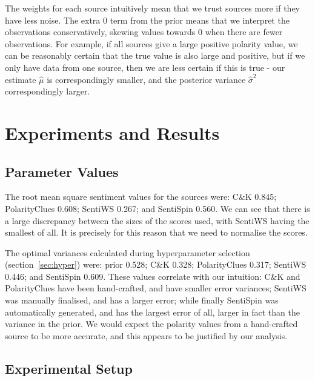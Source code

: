 \documentclass[11pt]{article}
\begin{document}
The weights for each source intuitively mean that we trust sources more if they have less noise. The extra $0$ term from the prior means that we interpret the observations conservatively, skewing values towards $0$ when there are fewer observations. For example, if all sources give a large positive polarity value, we can be reasonably certain that the true value is also large and positive, but if we only have data from one source, then we are less certain if this is
true - our estimate $\hat{\mu}$ is correspondingly smaller, and the posterior variance $\hat{\sigma}^2$ correspondingly larger.



\section{Experiments and Results} \label{sec:results}


\subsection{Parameter Values} \label{sec:param}

The root mean square sentiment values for the sources were: C\&K 0.845; PolarityClues 0.608; SentiWS 0.267; and SentiSpin 0.560.  We can see that there is a large discrepancy between the sizes of the scores used, with SentiWS having the smallest of all.  It is precisely for this reason that we need to normalise the scores.

The optimal variances calculated during hyperparameter selection (section~\ref{sec:hyper}) were: prior 0.528; C\&K 0.328; PolarityClues 0.317; SentiWS 0.446; and SentiSpin 0.609. These values correlate with our intuition: C\&K and PolarityClues have been hand-crafted, and have smaller error variances; SentiWS was manually finalised, and has a larger error; while finally SentiSpin was automatically generated, and has the largest error of all, larger in fact than the variance in the prior. We would expect the polarity values from a hand-crafted source to be more accurate, and this appears to be justified by our analysis.


\subsection{Experimental Setup} \label{sec:eval}
\end{document}
